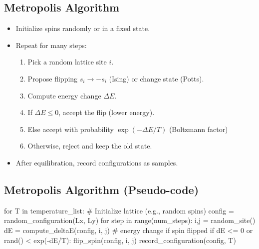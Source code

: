 \documentclass[%
oneside,                 %
final,                   %
10pt]{article}
\begin{document}
\noindent
\subsection{Metropolis Algorithm}
\begin{itemize}
\item Initialize spins randomly or in a fixed state.

\item Repeat for many steps:
\begin{enumerate}

 \item Pick a random lattice site $i$.

 \item Propose flipping $s_i \to -s_i$ (Ising) or change state (Potts).

 \item Compute energy change $\Delta E$.

 \item If $\Delta E \le 0$, accept the flip (lower energy).

 \item Else accept with probability $\exp(-\Delta E/T)$ (Boltzmann factor) 

 \item Otherwise, reject and keep the old state.

\end{enumerate}

\noindent
\item After equilibration, record configurations as samples.
\end{itemize}

\noindent
\subsection{Metropolis Algorithm (Pseudo-code)}










\bpycod
for T in temperature_list:
   # Initialize lattice (e.g., random spins)
   config = random_configuration(Lx, Ly)
   for step in range(num_steps):
       i,j = random_site()
       dE = compute_deltaE(config, i, j)  # energy change if spin flipped
       if dE <= 0 or rand() < exp(-dE/T):
           flip_spin(config, i, j)
   record_configuration(config, T)

\epycod


\end{document}
